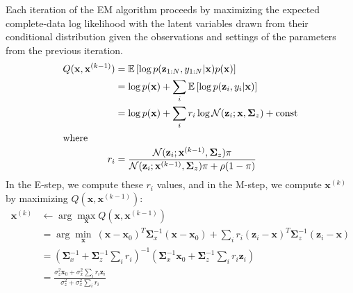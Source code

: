 \documentclass{article}
\newcommand{\bx}{\mathbf{x}}
\newcommand{\bz}{\mathbf{z}}
\newcommand{\bSigma}{{\bm \Sigma}}
\newcommand{\cN}{\mathcal{N}}
\newcommand{\E}[1]{\mathbb{E}\left[#1\right]}
\begin{document}
Each iteration of the EM algorithm proceeds by maximizing the expected complete-data log likelihood with the latent variables drawn from their conditional distribution given the observations and settings of the parameters from the previous iteration.
\begin{align*}
Q(\bx, \bx^{(k-1)}) &= \E{\log p(\bz_{1:N}, y_{1:N} | \bx)p(\bx)} \\
 &= \log p(\bx) + \sum_i \E{\log p(\bz_i, y_i | \bx)} \\
 &= \log p(\bx) + \sum_i r_i \log \cN(\bz_i; \bx, \bSigma_z) + \mbox{const} \\
 \intertext{where}
 r_i &= \frac{\cN(\bz_i; \bx^{(k-1)}, \bSigma_z) \pi}{\cN(\bz_i; \bx^{(k-1)}, \bSigma_z)\pi + \rho(1-\pi)}
\end{align*}
In the E-step, we compute these $r_i$ values, and in the M-step, we compute $\bx^{(k)}$ by maximizing $Q(\bx, \bx^{(k-1)})$:
\begin{align*}
\bx^{(k)} &\leftarrow \arg \max_\bx Q(\bx, \bx^{(k-1)}) \\
 &= \arg\min_\bx \ (\bx-\bx_0)^T\bSigma_x^{-1}(\bx-\bx_0) + \sum_i r_i(\bz_i-\bx)^T\bSigma_z^{-1}(\bz_i-\bx) \\
 &= \left(\bSigma_x^{-1} + \bSigma_z^{-1}\sum_i r_i \right)^{-1} \left(\bSigma_x^{-1}\bx_0 + \bSigma_z^{-1}\sum_i r_i\bz_i \right) \\
 &= \frac{\sigma_z^2\bx_0 + \sigma_x^2\sum_i r_i\bz_i}{\sigma_z^2 + \sigma_x^2\sum_i r_i}
\end{align*}
\end{document}
